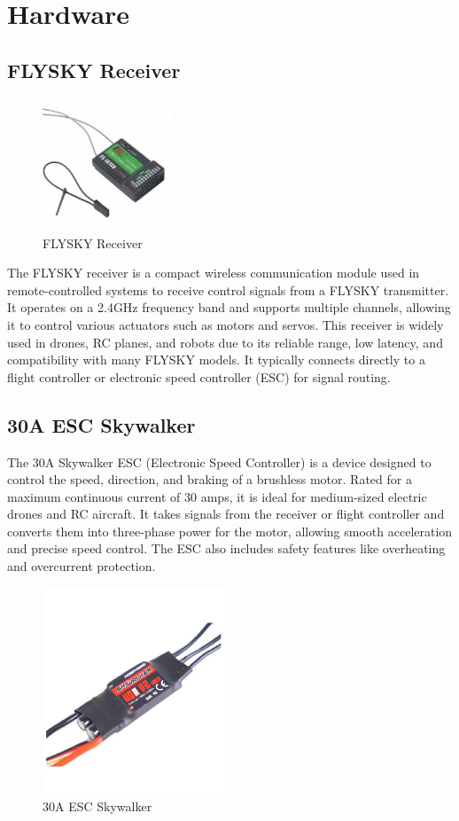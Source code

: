 \section{Hardware}
\subsection{FLYSKY Receiver}
\begin{figure}[H]
\centering
\includegraphics[width=0.35\textwidth]{images/flysky receiver.jpg}
\caption{FLYSKY Receiver}
\end{figure}
The FLYSKY receiver is a compact wireless communication module used in remote-controlled systems to receive control signals from a FLYSKY transmitter. It operates on a 2.4GHz frequency band and supports multiple channels, allowing it to control various actuators such as motors and servos. This receiver is widely used in drones, RC planes, and robots due to its reliable range, low latency, and compatibility with many FLYSKY models. It typically connects directly to a flight controller or electronic speed controller (ESC) for signal routing.

\subsection{30A ESC Skywalker}
The 30A Skywalker ESC (Electronic Speed Controller) is a device designed to control the speed, direction, and braking of a brushless motor. Rated for a maximum continuous current of 30 amps, it is ideal for medium-sized electric drones and RC aircraft. It takes signals from the receiver or flight controller and converts them into three-phase power for the motor, allowing smooth acceleration and precise speed control. The ESC also includes safety features like overheating and overcurrent protection.
\begin{figure}
\centering
\includegraphics[width=0.5\textwidth]{images/esc.jpg}
\caption{30A ESC Skywalker}
\end{figure}

